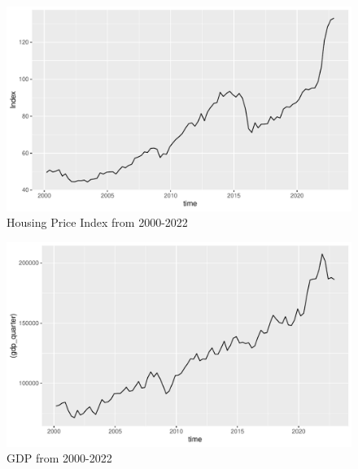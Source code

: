 \documentclass[12pt]{article}
\begin{document}
\begin{spacing}{2}
\begin{figure}[H] %
\centering %
\includegraphics[width=1\textwidth]{houseIndex.pdf} %
\caption{Housing Price Index from 2000-2022} %
\label{Fig.main2} %
\end{figure}

\begin{figure}[H] %
\centering %
\includegraphics[width=1\textwidth]{GDP.pdf} %
\caption{GDP from 2000-2022} %
\label{Fig.main3} %
\end{figure}


\end{spacing}
\end{document}
